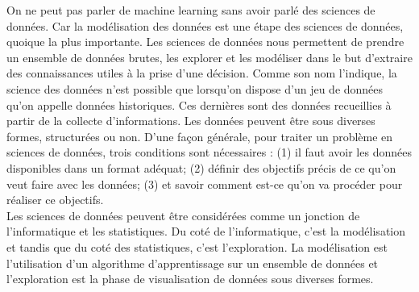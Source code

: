 \documentclass[12pt, french]{report}
\begin{document}
On ne peut pas parler de machine learning sans avoir parlé des sciences de données. Car la modélisation des données est une étape des sciences de données, quoique la plus importante. Les sciences de données nous permettent de prendre un ensemble de données brutes, les explorer et les modéliser dans le but d'extraire des connaissances utiles à la prise d'une décision. Comme son nom l'indique, la science des données n'est possible que lorsqu'on dispose d'un jeu de données qu'on appelle données historiques. Ces dernières sont des données recueillies à partir de la collecte d'informations. Les données peuvent être sous diverses formes, structurées ou non. D'une façon générale, pour traiter un problème en sciences de données, trois conditions sont nécessaires : (1) il faut avoir les données disponibles dans un format adéquat; (2) définir des objectifs précis de ce qu'on veut faire avec les données; (3) et savoir comment est-ce qu'on va procéder pour réaliser ce objectifs. \\

Les sciences de données peuvent être considérées comme un jonction de l'informatique et les statistiques. Du coté de l'informatique, c'est la modélisation et tandis que du coté des statistiques, c'est l'exploration. La modélisation est l'utilisation d'un algorithme d'apprentissage sur un ensemble de données et l'exploration est la phase de visualisation de données sous diverses formes. 


	
\end{document}
